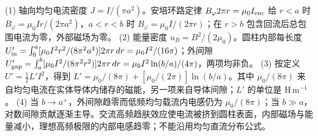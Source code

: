 (1) 轴向均匀电流密度 \(J=I/(\pi a^2)\)。安培环路定律 \(B_\varphi 2\pi r=\mu_0I_{\rm enc}\) 给 \(r<a\) 时 \(B_\varphi=\mu_0Ir/(2\pi a^2)\)，\(a<r<b\) 时 \(B_\varphi=\mu_0I/(2\pi r)\)；在 \(r>b\) 包含回流后总包围电流为零，外部磁场为零。
(2) 能量密度 \(u_B=B^2/(2\mu_0)\)。圆柱内部每长度 \(U'_{\rm in}=\int_0^a[\mu_0I^2r^2/(8\pi^2a^4)]2\pi r\,dr=\mu_0I^2/(16\pi)\)；外间隙 \(U'_{\rm gap}=\int_a^b[\mu_0I^2/(8\pi^2r^2)]2\pi r\,dr=\mu_0I^2\ln(b/a)/(4\pi)\)，两项均非负。
(3) 按定义 \(U'=\frac12L'I^2\)，得到 \(L'=\mu_0/(8\pi)+[\mu_0/(2\pi)]\ln(b/a)\)。其中 \(\mu_0/(8\pi)\) 来自均匀电流在实体导体内储存的磁能，另一项来自导体间隙；\(L'\) 的单位是 \(\mathrm{H\,m^{-1}}\)。
(4) 当 \(b\to a^+\)，外间隙趋零而低频均匀载流内电感仍为 \(\mu_0/(8\pi)\)；当 \(b\gg a\)，对数间隙贡献逐渐主导。交流高频趋肤效应使电流被挤到圆柱表面，内部磁场与能量减小，理想高频极限的内部电感趋零；不能沿用均匀直流分布公式。
